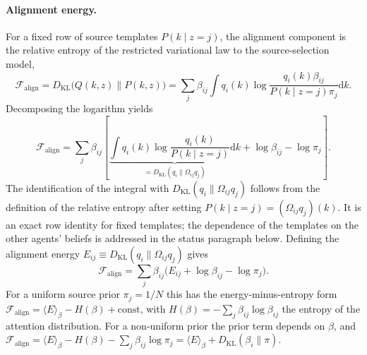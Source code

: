 \paragraph{Alignment energy.}
For a fixed row of source templates $P(k\mid z{=}j)$, the alignment component is the relative entropy of the restricted variational law to the source-selection model,
\begin{equation}
\mathcal{F}_{\text{align}} = D_{\mathrm{KL}}\big(Q(k,z) \| P(k,z)\big) = \sum_j \beta_{ij} \int q_i(k) \log \frac{q_i(k) \beta_{ij}}{P(k \mid z{=}j) \pi_j} \mathrm{d}k.
\end{equation}
Decomposing the logarithm yields
\begin{equation}
\mathcal{F}_{\text{align}} = \sum_j \beta_{ij} \left[ \underbrace{\int q_i(k) \log \frac{q_i(k)}{P(k \mid z{=}j)} \mathrm{d}k}_{= D_{\mathrm{KL}}(q_i \| \Omega_{ij} q_j)} + \log \beta_{ij} - \log \pi_j \right].
\label{eq:mixture_free_energy}
\end{equation}
The identification of the integral with $D_{\mathrm{KL}}(q_i \| \Omega_{ij} q_j)$ follows from the definition of the relative entropy after setting $P(k \mid z{=}j) = (\Omega_{ij} q_j)(k)$. It is an exact row identity for fixed templates; the dependence of the templates on the other agents' beliefs is addressed in the status paragraph below. Defining the alignment energy $E_{ij} \equiv D_{\mathrm{KL}}(q_i \| \Omega_{ij} q_j)$ gives
\begin{equation}
\mathcal{F}_{\text{align}} = \sum_j \beta_{ij} \big( E_{ij} + \log \beta_{ij} - \log \pi_j \big).
\label{eq:mixture_energy_entropy}
\end{equation}
For a uniform source prior $\pi_j = 1/N$ this has the energy-minus-entropy form $\mathcal{F}_{\text{align}} = \langle E \rangle_\beta - H(\beta) + \text{const}$, with $H(\beta) = -\sum_j \beta_{ij} \log \beta_{ij}$ the entropy of the attention distribution. For a non-uniform prior the prior term depends on $\beta$, and $\mathcal{F}_{\text{align}} = \langle E \rangle_\beta - H(\beta) - \sum_j \beta_{ij} \log \pi_j = \langle E \rangle_\beta + D_{\mathrm{KL}}(\beta_i \| \pi)$.

